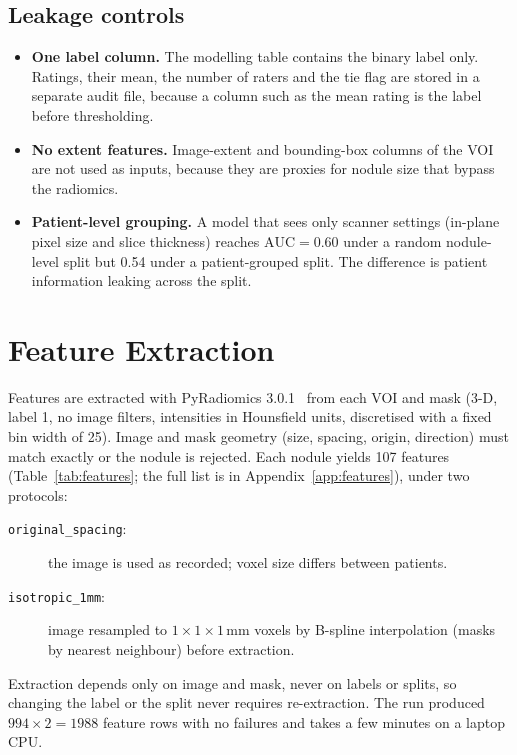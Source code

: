 \documentclass[journal]{IEEEtran}
\newcommand{\auc}{\mathrm{AUC}}
\newcommand{\code}[1]{\texttt{#1}}
\begin{document}
\subsection{Leakage controls}
\begin{itemize}
  \item \textbf{One label column.} The modelling table contains the binary label only. Ratings, their mean,
        the number of raters and the tie flag are stored in a separate audit file, because a column such as
        the mean rating is the label before thresholding.
  \item \textbf{No extent features.} Image-extent and bounding-box columns of the VOI are not used as inputs,
        because they are proxies for nodule size that bypass the radiomics.
  \item \textbf{Patient-level grouping.} A model that sees only scanner settings (in-plane pixel size and slice
        thickness) reaches $\auc=0.60$ under a random nodule-level split but 0.54 under a patient-grouped split.
        The difference is patient information leaking across the split.
\end{itemize}

\section{Feature Extraction}
\label{sec:features}
Features are extracted with PyRadiomics 3.0.1~\cite{vangriethuysen2017pyradiomics} from each VOI and mask
(3-D, label 1, no image filters, intensities in Hounsfield units, discretised with a fixed bin width of 25).
Image and mask geometry (size, spacing, origin, direction) must match exactly or the nodule is rejected.
Each nodule yields 107 features (Table~\ref{tab:features}; the full list is in Appendix~\ref{app:features}),
under two protocols:
\begin{description}
  \item[\code{original\_spacing}:] the image is used as recorded; voxel size differs between patients.
  \item[\code{isotropic\_1mm}:] image resampled to $1\times1\times1$\,mm voxels by B-spline interpolation
        (masks by nearest neighbour) before extraction.
\end{description}
Extraction depends only on image and mask, never on labels or splits, so changing the label or the split
never requires re-extraction. The run produced $994\times 2 = 1988$ feature rows with no failures
and takes a few minutes on a laptop CPU.
\end{document}
